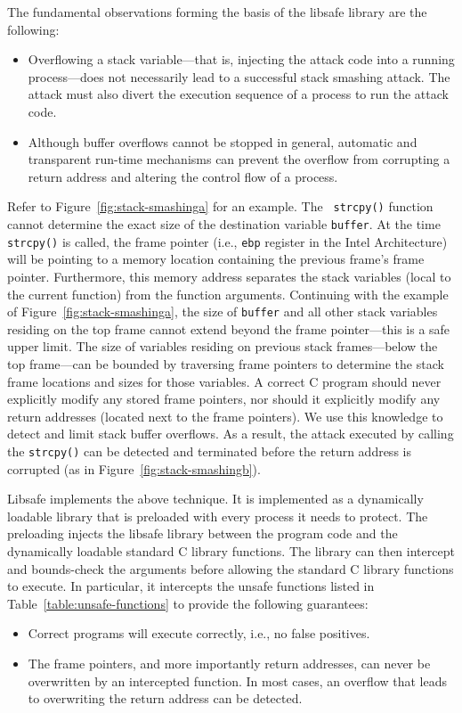 \documentclass[]{article}
\newcommand{\compress}{
	\parskip 0in
	\topsep 0in
	\itemsep 0in
	\partopsep 0in
}
\begin{document}
The fundamental observations forming the basis of the libsafe library are the
following:
\begin{itemize}
\compress
\item
Overflowing a stack variable---that is, injecting the attack code into a
running process---does not necessarily lead to a successful stack smashing
attack.  The attack must also divert the execution sequence of a process to run
the attack code.
\item
Although buffer overflows cannot be stopped in general, automatic and
transparent run-time mechanisms can prevent the overflow from corrupting a
return address and altering the control flow of a process.
\end{itemize}

Refer to Figure~\ref{fig:stack-smashinga} for an example.  The {\tt
strcpy()} function cannot determine the exact size of the destination
variable {\tt buffer}.  At the time {\tt strcpy()} is called, the
frame pointer (i.e., {\tt ebp} register in the Intel Architecture)
will be pointing to a memory location containing the previous frame's
frame pointer.  Furthermore, this memory address separates the stack
variables (local to the current function) from the function arguments.
Continuing with the example of Figure~\ref{fig:stack-smashinga}, the
size of {\tt buffer} and all other stack variables residing on the top
frame cannot extend beyond the frame pointer---this is a safe upper
limit.  The size of variables residing on previous stack
frames---below the top frame---can be bounded by traversing frame
pointers to determine the stack frame locations and sizes for those
variables.  A correct C program should never explicitly modify any
stored frame pointers, nor should it explicitly modify any return
addresses (located next to the frame pointers).  We use this knowledge
to detect and limit stack buffer overflows.  As a result, the attack
executed by calling the {\tt strcpy()} can be detected and terminated
before the return address is corrupted (as in
Figure~\ref{fig:stack-smashingb}).

Libsafe implements the above technique.  It is implemented as a dynamically
loadable library that is preloaded with every process it needs to protect.  The
preloading injects the libsafe library between the program code and the
dynamically loadable standard C library functions.  The library can then
intercept and bounds-check the arguments before allowing the standard C library
functions to execute.  In particular, it intercepts the unsafe functions listed
in Table~\ref{table:unsafe-functions} to provide the following guarantees:
\begin{itemize}
\compress
\item Correct programs will execute correctly, i.e., no false positives.
\item The frame pointers, and more importantly return addresses, can never be
	overwritten by an intercepted function.  In most cases, an overflow
	that leads to overwriting the return address can be detected.
\end{itemize}
\end{document}
